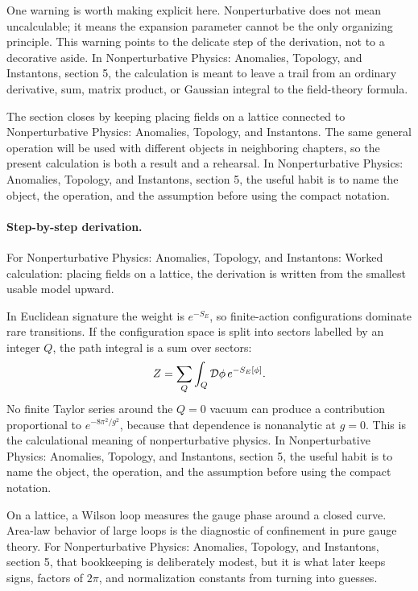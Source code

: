 One warning is worth making explicit here.  Nonperturbative does not mean uncalculable; it means the expansion parameter cannot be the only organizing principle.  This warning points to the delicate step of the derivation, not to a decorative aside.  In Nonperturbative Physics: Anomalies, Topology, and Instantons, section 5, the calculation is meant to leave a trail from an ordinary derivative, sum, matrix product, or Gaussian integral to the field-theory formula.

The section closes by keeping placing fields on a lattice connected to Nonperturbative Physics: Anomalies, Topology, and Instantons.  The same general operation will be used with different objects in neighboring chapters, so the present calculation is both a result and a rehearsal.  In Nonperturbative Physics: Anomalies, Topology, and Instantons, section 5, the useful habit is to name the object, the operation, and the assumption before using the compact notation.



\paragraph{Step-by-step derivation.}

For Nonperturbative Physics: Anomalies, Topology, and Instantons: Worked calculation: placing fields on a lattice, the derivation is written from the smallest usable model upward.

In Euclidean signature the weight is \(e^{-S_E}\), so finite-action configurations dominate rare transitions.  If the configuration space is split into sectors labelled by an integer \(Q\), the path integral is a sum over sectors:
\[
  Z=\sum_Q\int_Q\mathcal D\phi\,e^{-S_E[\phi]}.
\]
No finite Taylor series around the \(Q=0\) vacuum can produce a contribution proportional to \(e^{-8\pi^2/g^2}\), because that dependence is nonanalytic at \(g=0\).  This is the calculational meaning of nonperturbative physics.  In Nonperturbative Physics: Anomalies, Topology, and Instantons, section 5, the useful habit is to name the object, the operation, and the assumption before using the compact notation.

On a lattice, a Wilson loop measures the gauge phase around a closed curve.  Area-law behavior of large loops is the diagnostic of confinement in pure gauge theory.  For Nonperturbative Physics: Anomalies, Topology, and Instantons, section 5, that bookkeeping is deliberately modest, but it is what later keeps signs, factors of \(2\pi\), and normalization constants from turning into guesses.

